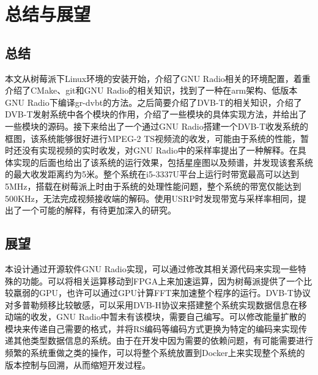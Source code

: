 \chapter{总结与展望}
	\section{总结}
	\par 本文从树莓派下Linux环境的安装开始，介绍了GNU Radio相关的环境配置，着重介绍了CMake、git和GNU Radio的相关知识，找到了一种在arm架构、低版本GNU Radio下编译gr-dvbt的方法。之后简要介绍了DVB-T的相关知识，介绍了DVB-T发射系统中各个模块的作用，介绍了一些模块的具体实现方法，并给出了一些模块的源码。接下来给出了一个通过GNU Radio搭建一个DVB-T收发系统的框图，该系统能够很好进行MPEG-2 TS视频流的收发，可能由于系统的性能，暂时还没有实现视频的实时收发，对GNU Radio中的采样率提出了一种解释。在具体实现的后面也给出了该系统的运行效果，包括星座图以及频谱，并发现该套系统的最大收发距离约为5米。整个系统在i5-3337U平台上运行时带宽最高可以达到5MHz，搭载在树莓派上时由于系统的处理性能问题，整个系统的带宽仅能达到500KHz，无法完成视频接收端的解码。使用USRP时发现带宽与采样率相同，提出了一个可能的解释，有待更加深入的研究。
	\section{展望}
	\par 本设计通过开源软件GNU Radio实现，可以通过修改其相关源代码来实现一些特殊的功能。可以将相关运算移动到FPGA上来加速运算，因为树莓派提供了一个比较羸弱的GPU，也许可以通过GPU计算FFT来加速整个程序的运行。DVB-T协议对多普勒频移比较敏感，可以采用DVB-H协议来搭建整个系统实现数据信息在移动端的收发，GNU Radio中暂未有该模块，需要自己编写。可以修改能量扩散的模块来传递自己需要的格式，并将RS编码等编码方式更换为特定的编码来实现传递其他类型数据信息的系统。由于在开发中因为需要的依赖问题，有可能需要进行频繁的系统重做之类的操作，可以将整个系统放置到Docker上来实现整个系统的版本控制与回溯，从而缩短开发过程。